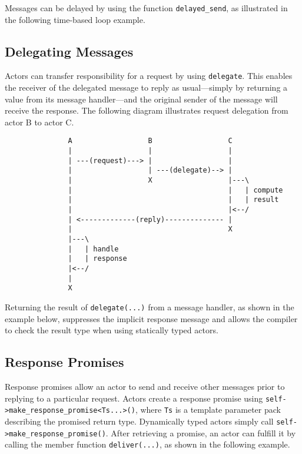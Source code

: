 Messages can be delayed by using the function \lstinline^delayed_send^, as
illustrated in the following time-based loop example.


\clearpage
\subsection{Delegating Messages}
\label{delegate}

Actors can transfer responsibility for a request by using \lstinline^delegate^.
This enables the receiver of the delegated message to reply as usual---simply
by returning a value from its message handler---and the original sender of the
message will receive the response. The following diagram illustrates request
delegation from actor B to actor C.

\begin{footnotesize}
\begin{verbatim}
               A                  B                  C
               |                  |                  |
               | ---(request)---> |                  |
               |                  | ---(delegate)--> |
               |                  X                  |---\
               |                                     |   | compute
               |                                     |   | result
               |                                     |<--/
               | <-------------(reply)-------------- |
               |                                     X
               |---\
               |   | handle
               |   | response
               |<--/
               |
               X
\end{verbatim}
\end{footnotesize}

Returning the result of \lstinline^delegate(...)^ from a message handler, as
shown in the example below, suppresses the implicit response message and allows
the compiler to check the result type when using statically typed actors.

\cppexample[15-42]{message_passing/delegating}

\subsection{Response Promises}
\label{promise}

Response promises allow an actor to send and receive other messages prior to
replying to a particular request. Actors create a response promise using
\lstinline^self->make_response_promise<Ts...>()^, where \lstinline^Ts^ is a
template parameter pack describing the promised return type. Dynamically typed
actors simply call \lstinline^self->make_response_promise()^. After retrieving
a promise, an actor can fulfill it by calling the member function
\lstinline^deliver(...)^, as shown in the following example.

